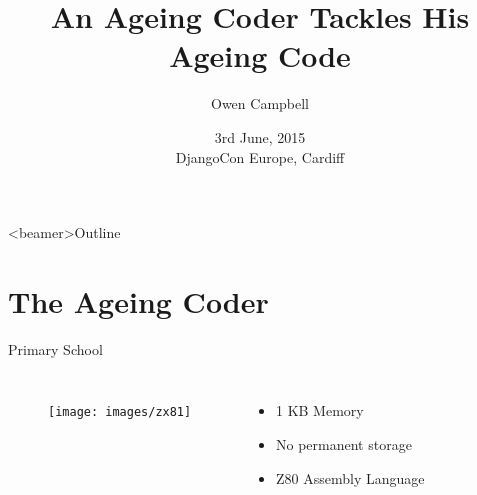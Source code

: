 \documentclass{beamer}
\title{An Ageing Coder Tackles His Ageing Code}
\author{Owen Campbell}
\date[DjangoCon Europe 2015]{3rd June, 2015\\DjangoCon Europe, Cardiff}
\begin{document}
\begin{frame}
  \titlepage{}
\end{frame}

{
  \begin{frame}<beamer>{Outline}
    \tableofcontents
  \end{frame}
}

\section{The Ageing Coder}

  \begin{frame}{Primary School}
    \begin{columns}
        \begin{figure}
          \texttt{[image: images/zx81]}
        \end{figure}
        \begin{itemize}
          \item 1 KB Memory
          \item No permanent storage
          \item Z80 Assembly Language
        \end{itemize}
    \end{columns}
  \end{frame}
\end{document}
